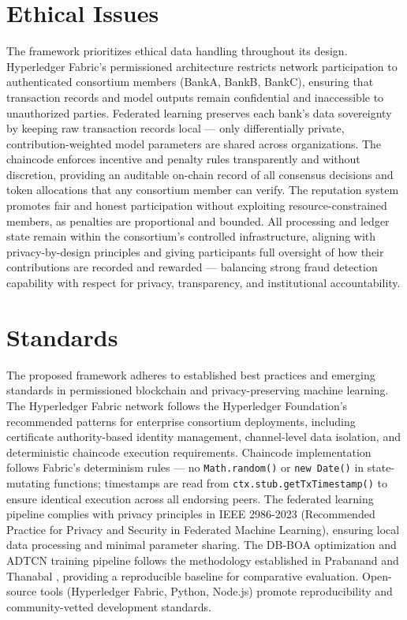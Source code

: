\section{Ethical Issues}
The framework prioritizes ethical data handling throughout its design. Hyperledger Fabric's permissioned architecture restricts network participation to authenticated consortium members (BankA, BankB, BankC), ensuring that transaction records and model outputs remain confidential and inaccessible to unauthorized parties. Federated learning preserves each bank's data sovereignty by keeping raw transaction records local — only differentially private, contribution-weighted model parameters are shared across organizations. The chaincode enforces incentive and penalty rules transparently and without discretion, providing an auditable on-chain record of all consensus decisions and token allocations that any consortium member can verify. The reputation system promotes fair and honest participation without exploiting resource-constrained members, as penalties are proportional and bounded. All processing and ledger state remain within the consortium's controlled infrastructure, aligning with privacy-by-design principles and giving participants full oversight of how their contributions are recorded and rewarded — balancing strong fraud detection capability with respect for privacy, transparency, and institutional accountability.

\section{Standards}
The proposed framework adheres to established best practices and emerging standards in permissioned blockchain and privacy-preserving machine learning. The Hyperledger Fabric network follows the Hyperledger Foundation's recommended patterns for enterprise consortium deployments, including certificate authority-based identity management, channel-level data isolation, and deterministic chaincode execution requirements. Chaincode implementation follows Fabric's determinism rules — no \texttt{Math.random()} or \texttt{new Date()} in state-mutating functions; timestamps are read from \texttt{ctx.stub.getTxTimestamp()} to ensure identical execution across all endorsing peers. The federated learning pipeline complies with privacy principles in IEEE 2986-2023 (Recommended Practice for Privacy and Security in Federated Machine Learning), ensuring local data processing and minimal parameter sharing. The DB-BOA optimization and ADTCN training pipeline follows the methodology established in Prabanand and Thanabal \cite{prabanand2025}, providing a reproducible baseline for comparative evaluation. Open-source tools (Hyperledger Fabric, Python, Node.js) promote reproducibility and community-vetted development standards.

